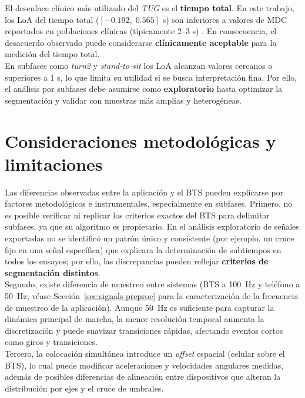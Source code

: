 \documentclass[12pt]{report}
\begin{document}
\begin{justify}
    El desenlace clínico más utilizado del \textit{TUG} es el \textbf{tiempo total}. En este trabajo, los LoA del tiempo total ($[-0.192,\;0.565]$ s) son inferiores a valores de MDC reportados en poblaciones clínicas (típicamente 2--3 s) \cite{Steffen2008_MDC_TUG_parkinsonism,Huang2011_MDC_TUG_PD,Ries2009_MDC_TUG_Alzheimer}. En consecuencia, el desacuerdo observado puede considerarse \textbf{clínicamente aceptable} para la medición del tiempo total.\\

    En subfases como \textit{turn2} y \textit{stand-to-sit} los LoA alcanzan valores cercanos o superiores a 1 s, lo que limita su utilidad si se busca interpretación fina. Por ello, el análisis por subfases debe asumirse como \textbf{exploratorio} hasta optimizar la segmentación y validar con muestras más amplias y heterogéneas.\\



    \section{Consideraciones metodológicas y limitaciones}
    \label{sec:consideraciones}

    Las diferencias observadas entre la aplicación y el BTS pueden explicarse por factores metodológicos e instrumentales, especialmente en subfases. Primero, no es posible verificar ni replicar los criterios exactos del BTS para delimitar subfases, ya que su algoritmo es propietario. En el análisis exploratorio de señales exportadas no se identificó un patrón único y consistente (por ejemplo, un cruce fijo en una señal específica) que explicara la determinación de subtiempos en todos los ensayos; por ello, las discrepancias pueden reflejar \textbf{criterios de segmentación distintos}.\\

    Segundo, existe diferencia de muestreo entre sistemas (BTS a 100~Hz y teléfono a 50~Hz; véase Sección~\ref{sec:signals-preproc} para la caracterización de la frecuencia de muestreo de la aplicación). Aunque 50~Hz es suficiente para capturar la dinámica principal de marcha, la menor resolución temporal aumenta la discretización y puede suavizar transiciones rápidas, afectando eventos cortos como giros y transiciones.\\

    Tercero, la colocación simultánea introduce un \textit{offset} espacial (celular sobre el BTS), lo cual puede modificar aceleraciones y velocidades angulares medidas, además de posibles diferencias de alineación entre dispositivos que alteran la distribución por ejes y el cruce de umbrales.\\


\end{justify}
\end{document}
